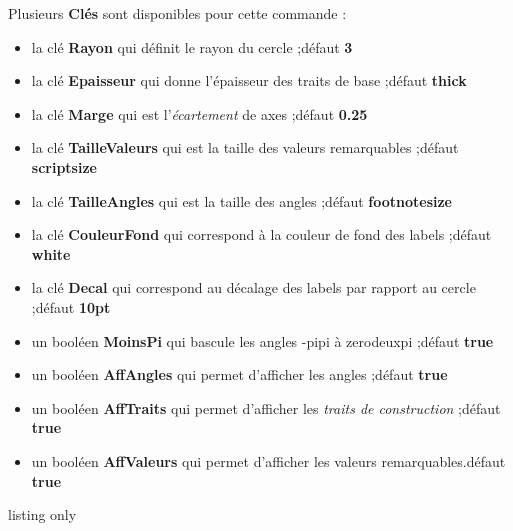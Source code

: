 \documentclass[a4paper,french,11pt]{article}
\newcommand\Cle[1]{{\bfseries\sffamily\textlangle \textcolor{orange!75!black}{#1}\textrangle}}
\begin{document}
\begin{cautionblock}
Plusieurs \Cle{Clés} sont disponibles pour cette commande :

\begin{itemize}
	\item la clé \Cle{Rayon} qui définit le rayon du cercle ;\hfill{}défaut \Cle{3}
	\item la clé \Cle{Epaisseur} qui donne l'épaisseur des traits de base ;\hfill{}défaut \Cle{thick}
	\item la clé \Cle{Marge} qui est l'\textit{écartement} de axes  ;\hfill{}défaut \Cle{0.25}
	\item la clé \Cle{TailleValeurs} qui est la taille des valeurs remarquables ;\hfill{}défaut \Cle{scriptsize}
	\item la clé \Cle{TailleAngles} qui est la taille des angles ;\hfill{}défaut \Cle{footnotesize}
	\item la clé \Cle{CouleurFond} qui correspond à la couleur de fond des labels ;\hfill{}défaut \Cle{white}
	\item la clé \Cle{Decal} qui correspond au décalage des labels par rapport au cercle ;\hfill{}défaut \Cle{10pt}
	\item un booléen \Cle{MoinsPi} qui bascule les angles \og -pipi \fg{} à \og zerodeuxpi \fg{} ;\hfill{}défaut \Cle{true}
	\item un booléen \Cle{AffAngles} qui permet d'afficher les angles ;\hfill{}défaut \Cle{true}
	\item un booléen \Cle{AffTraits} qui permet d'afficher les \textit{traits de construction}  ;\hfill{}défaut \Cle{true}
	\item un booléen \Cle{AffValeurs} qui permet d'afficher les valeurs remarquables.\hfill{}défaut \Cle{true}
\end{itemize}
\vspace*{-\baselineskip}\leavevmode
\end{cautionblock}

\pagebreak

\begin{PresCodeTexPL}{listing only}
\begin{center}
	\begin{tikzpicture}[line join=bevel]
			\CercleTrigo[Rayon=2.5,AffValeurs=false,Decal=8pt]
		\end{tikzpicture}
	~~~~
	\begin{tikzpicture}[line join=bevel]
			\CercleTrigo[Rayon=2.5,AffAngles=false]
		\end{tikzpicture}
	~~~~
	\begin{tikzpicture}[line join=bevel]
			\CercleTrigo[Rayon=2.5,MoinsPi=false,CouleurFond=orange!15]
		\end{tikzpicture}
\end{center}
\end{PresCodeTexPL}
\end{document}
